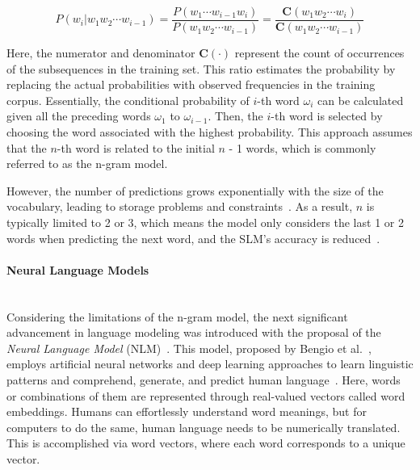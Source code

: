 \documentclass{DESSThesis}
\begin{document}
\begin{equation} \label{eq:MLE}
    P(w_{i}|w_{1}w_{2}\cdots w_{i-1})=\frac{P(w_{1}\cdots w_{i-1}w_{i})}{P(w_{1} w_{2}\cdots w_{i-1})}=\frac{\mathbf{C}(w_{1}w_{2}\cdots w_{i})}{\mathbf{C}(w_{1}w_{2}\cdots w_{i-1})}
\end{equation}

Here, the numerator and denominator $\mathbf{C(\cdot)}$ represent the count of occurrences of the subsequences in the training set. This ratio estimates the probability by replacing the actual probabilities with observed frequencies in the training corpus. Essentially, the conditional probability of $i$-th word $\omega_i$ can be calculated given all the preceding words $\omega_1$ to $\omega_{i-1}$. Then, the $i$-th word is selected by choosing the word associated with the highest probability. This approach assumes that the $n$-th word is related to the initial $n$ - 1 words, which is commonly referred to as the n-gram model. 

However, the number of predictions grows exponentially with the size of the vocabulary, leading to storage problems and constraints~\cite{wang2024historydevelopmentprincipleslarge}. As a result, $n$ is typically limited to 2 or 3, which means the model only considers the last 1 or 2 words when predicting the next word, and the SLM's accuracy is reduced~\cite{wang2024historydevelopmentprincipleslarge}.

\paragraph{Neural Language Models}\mbox{}\\

\noindent Considering the limitations of the n-gram model, the next significant advancement in language modeling was introduced with the proposal of the \emph{Neural Language Model} (NLM)~\cite{10.1145/3490443,review10433480}. This model, proposed by Bengio et al.~\cite{bengio2003neural}, employs artificial neural networks and deep learning approaches to learn linguistic patterns and comprehend, generate, and predict human language~\cite{review10433480,wang2024historydevelopmentprincipleslarge}. Here, words or combinations of them are represented through real-valued vectors called word embeddings. Humans can effortlessly understand word meanings, but for computers to do the same, human language needs to be numerically translated. This is accomplished via word vectors, where each word corresponds to a unique vector.
\end{document}
